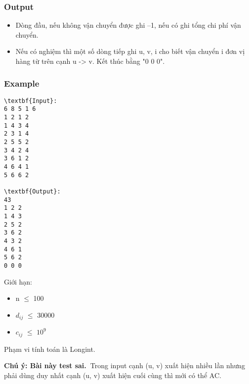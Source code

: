 \subsubsection{Output}
\begin{itemize}
	\item Dòng đầu, nếu không vận chuyển được ghi –1, nếu có ghi tổng chi phí vận chuyển.
	\item Nếu có nghiệm thì một số dòng tiếp ghi u, v, i cho biết vận chuyển i đơn vị hàng từ trên cạnh u -> v. Kết thúc bằng "0 0 0".
\end{itemize}

\subsubsection{Example}
\begin{verbatim}
\textbf{Input}:
6 8 5 1 6
1 2 1 2
1 4 3 4
2 3 1 4
2 5 5 2
3 4 2 4
3 6 1 2
4 6 4 1
5 6 6 2

\textbf{Output}:
43
1 2 2
1 4 3
2 5 2
3 6 2
4 3 2
4 6 1
5 6 2
0 0 0

\end{verbatim}

Giới hạn:
\begin{itemize}
	\item n  $\le$  100
	\item $d_{ij}$  $\le$  30000
	\item $c_{ij}$  $\le$  $10^{9}$
\end{itemize}

Phạm vi tính toán là Longint.

\textbf{Chú ý: Bài này test sai. }Trong input cạnh (u, v) xuất hiện nhiều lần nhưng phải dùng duy nhất cạnh (u, v) xuất hiện cuối cùng thì mới có thể AC.
